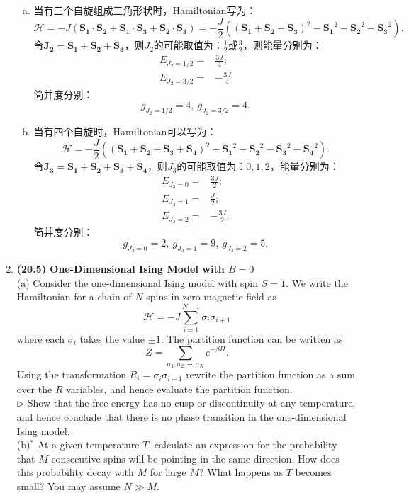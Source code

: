 \documentclass[reqno,a4paper,12pt]{amsart}
\begin{document}
\begin{enumerate}[1.]
\begin{tcolorbox}[breakable, colframe = black, colback = black!5!white]
\begin{enumerate}[(a)]
\item 当有三个自旋组成三角形状时，Hamiltonian写为：
\[
	\mathcal{H} = -J(\mathbf{S_1\cdot S_2} + \mathbf{S_1\cdot S_3} + \mathbf{S_2\cdot S_3}) = -\frac{J}{2}((\mathbf{S_1} + \mathbf{S_2} + \mathbf{S_3})^2 - \mathbf{S_1}^2 - \mathbf{S_2}^2 - \mathbf{S_3}^2).
\]
令$\mathbf{J_2} = \mathbf{S_1} + \mathbf{S_2} + \mathbf{S_3}$，则$J_2$的可能取值为：$\frac{1}{2}$或$\frac{3}{2}$，则能量分别为：
\begin{align*}
	E_{J_2 = 1/2} =& \frac{3J}{4}; \\
	E_{J_2 = 3/2} =& -\frac{3J}{4}
\end{align*}
简并度分别：
\[
	g_{J_2 = 1/2} = 4, ~ g_{J_2=3/2} = 4.
\]

\item 当有四个自旋时，Hamiltonian可以写为：
\[
	\mathcal{H} = -\frac{J}{2}((\mathbf{S_1} + \mathbf{S_2} + \mathbf{S_3} + \mathbf{S_4})^2 - \mathbf{S_1}^2 - \mathbf{S_2}^2 - \mathbf{S_3}^2 - \mathbf{S_4}^2).
\]
令$\mathbf{J_3} = \mathbf{S_1} + \mathbf{S_2} + \mathbf{S_3} + \mathbf{S_4}$，则$J_3$的可能取值为：$0,1,2$，能量分别为：
\begin{align*}
	E_{J_3 = 0} =& \frac{3J}{2}; \\
	E_{J_3 = 1} =& \frac{J}{2}; \\
	E_{J_3 = 2} =& -\frac{3J}{2}.
\end{align*}
简并度分别：
\[
	g_{J_3 = 0} = 2, ~ g_{J_3=1} = 9, ~ g_{J_3 = 2} = 5.
\]

\end{enumerate}
\end{tcolorbox}

\item \textbf{(20.5) One-Dimensional Ising Model with $B=0$} \\
(a) Consider the one-dimensional Ising model with spin $S=1$. We write the Hamiltonian for a chain of $N$ spins in zero magnetic field as 
\[
	\mathcal{H} = -J\sum_{i=1}^{N-1} \sigma_i\sigma_{i+1}
\]
where each $\sigma_i$ takes the value $\pm1$. The partition function can be written as 
\[
	Z = \sum_{\sigma_1,\sigma_2,\cdots,\sigma_N} e^{-\beta H}.
\]
Using the transformation $R_i = \sigma_i\sigma_{i+1}$ rewrite the partition function as a sum over the $R$ variables, and hence evaluate the partition function. \\
$\triangleright$ Show that the free energy has no cusp or discontinuity at any temperature, and hence conclude that there is no phase transition in the one-dimensional Ising model. \\
(b)${ }^*$ At a given temperature $T$, calculate an expression for the probability that $M$ consecutive spins will be pointing in the same direction. How does this probability decay with $M$ for large $M$? What happens as $T$ becomes small? You may assume $N\gg M$.
\begin{tcolorbox}[breakable, colframe = black, colback = black!5!white]
\begin{enumerate}[(a)]


\end{enumerate}
\end{tcolorbox}
\end{enumerate}
\end{document}

